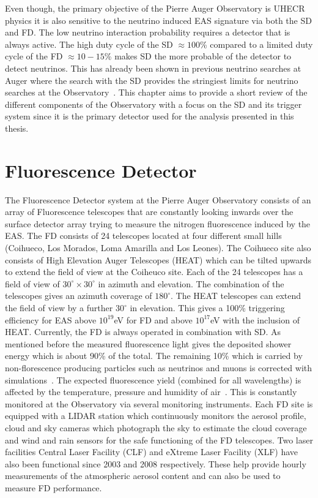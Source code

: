 Even though, the primary objective of the Pierre Auger Observatory is UHECR physics it is also sensitive to the neutrino induced EAS signature via both the SD and FD. The low neutrino interaction probability requires a detector that is always active. The high duty cycle of the SD $\approx 100$\% compared to a limited duty cycle of the FD $\approx 10-15$\% makes SD the more probable of the detector to detect neutrinos. This has already been shown in previous neutrino searches at Auger where the search with the SD provides the stringiest limits for neutrino searches at the Observatory~\cite{Aab_2019_diffuse}. This chapter aims to provide a short review of the different components of the Observatory with a focus on the SD and its trigger system since it is the primary detector used for the analysis presented in this thesis. 

\section{Fluorescence Detector}
\label{sec:Fl_det}
The Fluorescence Detector system at the Pierre Auger Observatory consists of an array of Fluorescence telescopes that are constantly looking inwards over the surface detector array trying to measure the nitrogen fluorescence induced by the EAS. The FD consists of 24 telescopes located at four different small hills (Coihueco, Los Morados, Loma Amarilla and Los Leones). The Coihueco site also consists of High Elevation Auger Telescopes (HEAT) which can be tilted upwards to extend the field of view at the Coiheuco site. Each of the 24 telescopes has a field of view of $30^{\circ} \times 30^{\circ}$ in azimuth and elevation. The combination of the telescopes gives an azimuth coverage of $180^{\circ}$. The HEAT telescopes can extend the field of view by a further $30^{\circ}$ in elevation. This gives a 100\% triggering efficiency for EAS above $10^{19}$eV for FD and above $10^{17}$eV with the inclusion of HEAT. Currently, the FD is always operated in combination with SD. As mentioned before the measured fluorescence light gives the deposited shower energy which is about 90\% of the total. The remaining 10\% which is carried by non-florescence producing particles such as neutrinos and muons is corrected with simulations~\cite{Abraham_2010_FD}. The expected fluorescence yield (combined for all wavelengths) is affected by the temperature, pressure and humidity of air~\cite{Rosado:2014bya}. This is constantly monitored at the Observatory via several monitoring instruments. Each FD site is equipped with a LIDAR station which continuously monitors the aerosol profile, cloud and sky cameras which photograph the sky to estimate the cloud coverage and wind and rain sensors for the safe functioning of the FD telescopes. Two laser facilities Central Laser Facility (CLF) and eXtreme Laser Facility (XLF) have also been functional since 2003 and 2008 respectively. These help provide hourly measurements of the atmospheric aerosol content and can also be used to measure FD performance. 

